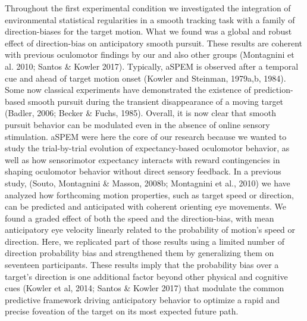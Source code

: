 \documentclass[profile,final,english, draft]{article}%
\begin{document}
Throughout the first experimental condition we investigated the integration of environmental statistical regularities in a smooth tracking task with a family of direction-biases for the target motion. What we found was a global and robust effect of direction-bias on anticipatory smooth pursuit. These results are coherent with previous oculomotor findings by our and also other groups (Montagnini et al. 2010; Santos \& Kowler 2017). Typically, aSPEM is observed after a temporal cue and ahead of target motion onset (Kowler and Steinman, 1979a,b, 1984). Some now classical experiments have demonstrated the existence of prediction-based smooth pursuit during the transient disappearance of a moving target (Badler, 2006; Becker \& Fuchs, 1985). Overall, it is now clear that smooth pursuit behavior can be modulated even in the absence of online sensory stimulation. aSPEM were here the core of our research because we wanted to study the trial-by-trial evolution of expectancy-based oculomotor behavior, as well as how sensorimotor expectancy interacts with reward contingencies in shaping oculomotor behavior without direct sensory feedback. In a previous study, (Souto, Montagnini \& Masson, 2008b; Montagnini et al., 2010) we have analyzed how forthcoming motion properties, such as target speed or direction, can be predicted and anticipated with coherent orienting eye movements. We found a graded effect of both the speed and the direction-bias, with mean anticipatory eye velocity linearly related to the probability of motion’s speed or direction. Here, we replicated part of those results using a limited number of direction probability bias and strengthened them by generalizing them on seventeen participants. These results imply that the probability bias over a target’s direction is one additional factor beyond other physical and cognitive cues (Kowler et al, 2014; Santos \& Kowler 2017) that modulate the common predictive framework driving anticipatory behavior to optimize a rapid and precise foveation of the target on its most expected future path. 
\end{document}
